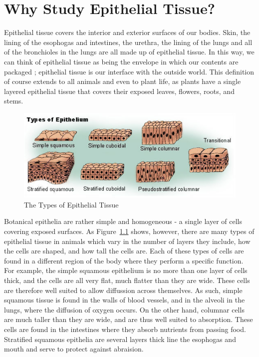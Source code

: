\chapter{Why Study Epithelial Tissue?}
Epithelial tissue covers the interior and exterior surfaces of our bodies. Skin, the lining of the esophogas and intestines, the urethra, the lining of the lungs and all of the bronchioles in the lungs are all made up of epithelial tissue. In this way, we can think of epithelial tissue as being the envelope in which our contents are packaged \cite{Shape Formation}; epithelial tissue is our interface with the outside world. This definition of course extends to all animals and even to plant life, as plants have a single layered epithelial tissue that covers their exposed leaves, flowers, roots, and stems. 

\begin{figure}[hb]
\centering \includegraphics[width=\textwidth]{../diagrams/output.png}
\caption{The Types of Epithelial Tissue}
\label{fig:types}
\end{figure}

Botanical epithelia are rather simple and homogeneous - a single layer of cells covering exposed surfaces. As Figure~\ref{fig:types} shows, however, there are many types of epithelial tissue in animals which vary in the number of layers they include, how the cells are shaped, and how tall the cells are. Each of these types of cells are found in a different region of the body where they perform a specific function.  For example, the simple squamous epithelium is no more than one layer of cells thick, and the cells are all very flat, much flatter than they are wide. These cells are therefore well suited to  allow diffussion across themselves. As such, simple squamous tissue is found in the walls of blood vessels, and in the alveoli in the lungs, where the diffusion of oxygen occurs. On the other hand, columnar cells are much taller than they are wide, and are thus well suited to absorption. These cells are found in the intestines where they absorb nutrients from passing food. Stratified squamous epithelia are several layers thick line the esophogas and mouth and serve to protect against abraision.

